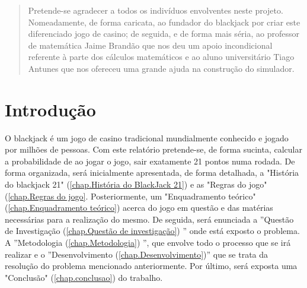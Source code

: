 \documentclass{report}
\begin{document}
\renewcommand{\abstractname}{Agradecimentos}
\begin{abstract}
Pretende-se agradecer a todos os indivíduos envolventes neste projeto. Nomeadamente, de forma caricata, ao fundador do blackjack por criar este diferenciado jogo de casino; de seguida, e de forma mais séria, ao professor de matemática Jaime Brandão que nos deu um apoio incondicional referente à parte dos cálculos matemáticos e ao aluno universitário Tiago Antunes que nos ofereceu uma grande ajuda na construção do simulador.
\end{abstract}


\tableofcontents


\clearpage
{}

\chapter{Introdução}
\label{chap.introducao}

O blackjack é um jogo de casino tradicional
mundialmente conhecido e jogado por milhões
de pessoas. Com este relatório pretende-se, de
forma sucinta, calcular a probabilidade de ao
jogar o jogo, sair exatamente 21 pontos numa
rodada. De forma organizada, será inicialmente
apresentada, de forma detalhada, a "História do blackjack 21" (\autoref{chap.História do BlackJack 21}) e as "Regras do jogo" (\autoref{chap.Regras do jogo}. Posteriormente, um "Enquadramento teórico" (\autoref{chap.Enquadramento teórico}) acerca
do jogo em questão e das matérias necessárias
para a realização do mesmo. De seguida, será
enunciada a ”Questão de Investigação (\autoref{chap.Questão de investigação}) ” onde está
exposto o problema. A ”Metodologia (\autoref{chap.Metodologia}) ”, que
envolve todo o processo que se irá realizar e
o ”Desenvolvimento (\autoref{chap.Desenvolvimento})” que se trata da resolução
do problema mencionado anteriormente. Por
último, será exposta uma "Conclusão" (\autoref{chap.conclusao}) do trabalho.
\end{document}
